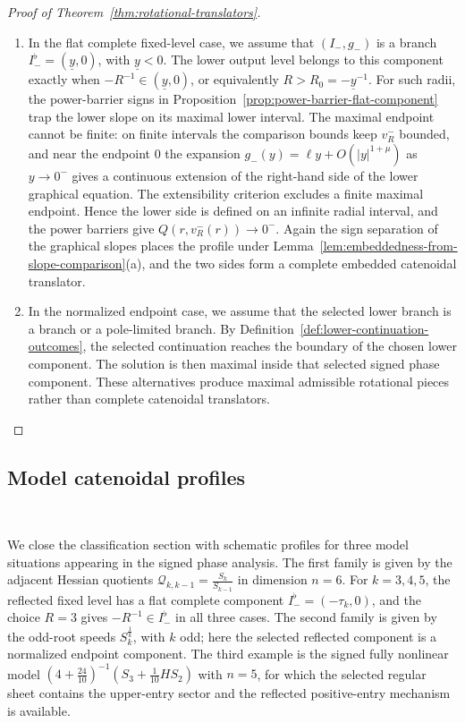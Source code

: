 \documentclass{amsart}
\theoremstyle{plain}
\theoremstyle{mainintrothm}
\theoremstyle{definition}
\begin{document}
\begin{proof}[Proof of Theorem~\ref{thm:rotational-translators}]
\begin{enumerate}
		\item In the flat complete fixed-level case, we assume that $(I_-,g_-)$ is a branch
		$I_-^\flat=(\underline y,0)$, with $\underline y<0$.  The lower output level
		belongs to this component exactly when $-R^{-1}\in(\underline y,0)$, or equivalently $R>R_0=-\underline {y}^{-1}$. For such radii, the power-barrier signs in Proposition~\ref{prop:power-barrier-flat-component} trap the lower slope on its maximal lower interval.  The maximal endpoint cannot be finite: on
		finite intervals the comparison bounds keep $v_R^-$ bounded, and near the
		endpoint $0$ the expansion $g_-(y)=\ell y+O(|y|^{1+\mu})$ as $y\to0^-$ gives a continuous extension of the right-hand side of the lower graphical
		equation.  The extensibility criterion \cite[Corollary~2.15]{teschl2012ordinary} excludes a finite maximal
		endpoint.  Hence the lower side is defined on an infinite radial interval,
		and the power barriers give $Q(r,v_R^-(r))\to0^- $.    Again the sign separation of the graphical slopes places the profile under
		Lemma~\ref{lem:embeddedness-from-slope-comparison}\textup{(a)}, and the two  sides form a complete embedded catenoidal translator.
		\item In the normalized endpoint case, we assume that the selected lower branch is a
		branch or a pole-limited branch.  By
		Definition~\ref{def:lower-continuation-outcomes}, the selected continuation
		reaches the boundary of the chosen lower component.  The solution is then
		maximal inside that selected signed phase component.  These alternatives
		produce maximal admissible rotational pieces rather than complete
		catenoidal translators.
	\end{enumerate}
	
\end{proof}


\subsection{Model catenoidal profiles}\,
\label{subsec:model-catenoidal-profiles}

We close the classification section with schematic profiles for three model
situations appearing in the signed phase analysis.  The first family is given by
the adjacent Hessian quotients $\mathcal Q_{k,k-1}=\frac{S_k}{S_{k-1}}$ in
dimension $n=6$.  For $k=3,4,5$, the reflected fixed level has a flat complete
component $I_-^\flat=(-\tau_k,0)$, and the choice $R=3$ gives
$-R^{-1}\in I_-^\flat$ in all three cases.  The second family is given by the
odd-root speeds $S_k^{\frac{1}{k}}$, with $k$ odd; here the selected reflected
component is a normalized endpoint component.  The third example is the signed
fully nonlinear model $\left(4+\frac{24}{10}\right)^{-1}\left(S_3+\frac{1}{10}HS_2\right)$ with $n=5$, for which the selected regular sheet contains the upper-entry sector and the reflected positive-entry mechanism is available.
\end{document}
